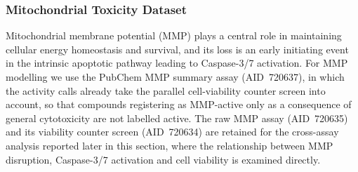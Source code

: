 \documentclass[letterpaper]{article}
\begin{document}
\subsubsection*{Mitochondrial Toxicity Dataset}

Mitochondrial membrane potential (MMP) plays a central role in maintaining
cellular energy homeostasis and survival, and its loss is an early initiating
event in the intrinsic apoptotic pathway leading to Caspase-3/7 activation.
For MMP modelling we use the PubChem MMP summary assay (AID~720637), in which
the activity calls already take the parallel cell-viability counter screen into
account, so that compounds registering as MMP-active only as a consequence of
general cytotoxicity are not labelled active. The raw MMP assay (AID~720635)
and its viability counter screen (AID~720634) are retained for the cross-assay
analysis reported later in this section, where the relationship between MMP
disruption, Caspase-3/7 activation and cell viability is examined directly.
\end{document}
